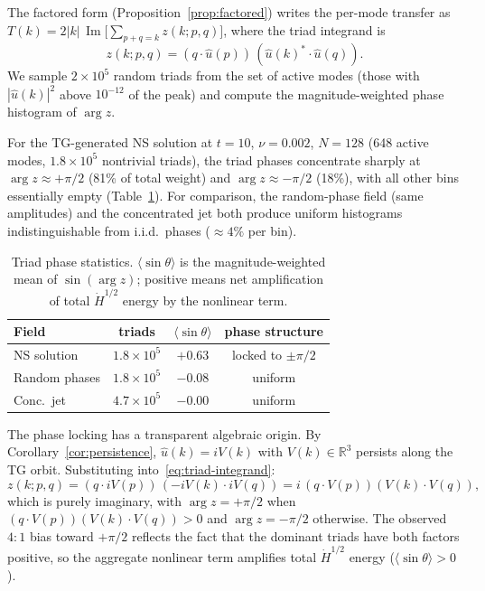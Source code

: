 \documentclass[11pt]{article}
\theoremstyle{definition}
\newcommand{\R}{\mathbb{R}}
\newcommand{\Hdot}[1]{\dot{H}^{#1}}
\DeclareMathOperator{\im}{Im}
\begin{document}
The factored form (Proposition~\ref{prop:factored}) writes
the per-mode transfer as
$T(k) = 2|k|\,\im\bigl[\sum_{p+q=k}z(k;p,q)\bigr]$,
where the triad integrand is
\begin{equation}\label{eq:triad-integrand}
z(k;p,q) = (q\cdot\hat u(p))\,
(\hat u(k)^*\cdot\hat u(q)).
\end{equation}
We sample $2\times 10^5$ random triads from the set of
active modes (those with $|\hat u(k)|^2$ above $10^{-12}$
of the peak) and compute the magnitude-weighted phase
histogram of $\arg z$.

For the TG-generated NS solution at $t=10$,
$\nu=0.002$, $N=128$ (648 active modes,
$1.8\times 10^5$ nontrivial triads), the triad phases
concentrate sharply at $\arg z \approx +\pi/2$ (81\%
of total weight) and $\arg z\approx -\pi/2$ (18\%),
with all other bins essentially empty
(Table~\ref{tab:triad-phase}).  For comparison, the
random-phase field (same amplitudes) and the
concentrated jet both produce uniform histograms
indistinguishable from i.i.d.\ phases
($\approx 4\%$ per bin).

\begin{table}[h]
\centering
\caption{Triad phase statistics.
$\langle\sin\theta\rangle$ is the magnitude-weighted
mean of $\sin(\arg z)$; positive means net amplification
of total $\Hdot{1/2}$ energy by the nonlinear term.}
\label{tab:triad-phase}
\begin{tabular}{@{}lccc@{}}
\toprule
Field & triads & $\langle\sin\theta\rangle$
  & phase structure \\
\midrule
NS solution    & $1.8\times 10^5$ & $+0.63$
  & locked to $\pm\pi/2$ \\
Random phases  & $1.8\times 10^5$ & $-0.08$
  & uniform \\
Conc.\ jet     & $4.7\times 10^5$ & $-0.00$
  & uniform \\
\bottomrule
\end{tabular}
\end{table}

The phase locking has a transparent algebraic origin.
By Corollary~\ref{cor:persistence}, $\hat u(k)=iV(k)$
with $V(k)\in\R^3$ persists along the TG orbit.
Substituting into~\eqref{eq:triad-integrand}:
\begin{equation}\label{eq:triad-imaginary}
z(k;p,q) = (q\cdot iV(p))\,(-iV(k)\cdot iV(q))
= i\,(q\cdot V(p))(V(k)\cdot V(q)),
\end{equation}
which is purely imaginary, with
$\arg z = +\pi/2$ when $(q\cdot V(p))(V(k)\cdot V(q))>0$
and $\arg z = -\pi/2$ otherwise.  The observed $4\!:\!1$
bias toward $+\pi/2$ reflects the fact that the dominant
triads have both factors positive, so the aggregate
nonlinear term amplifies total $\Hdot{1/2}$ energy
($\langle\sin\theta\rangle>0$).
\end{document}
